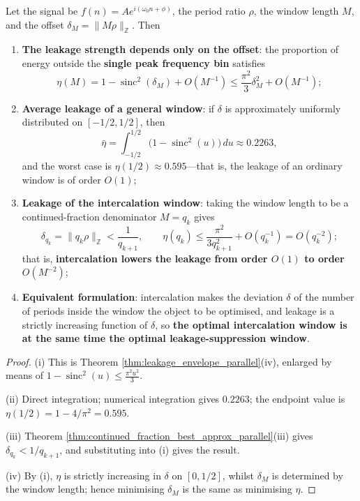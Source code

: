 \begin{theorem}\label{thm:intercalation_leakage_suppression}
Let the signal be $f(n)=Ae^{i(\omega_0n+\phi)}$, the period ratio $\rho$, the window length $M$, and the offset $\delta_M=\|M\rho\|_{\mathbb{Z}}$. Then
\begin{enumerate}[label=(\roman*)]
    \item \textbf{The leakage strength depends only on the offset}: the proportion of energy outside the \textbf{single peak frequency bin} satisfies
    \[
    \eta(M)=1-\operatorname{sinc}^2(\delta_M)+O(M^{-1})\le\frac{\pi^2}{3}\delta_M^{2}+O(M^{-1});
    \]
    \item \textbf{Average leakage of a general window}: if $\delta$ is approximately uniformly distributed on $[-1/2,1/2]$, then
    \[
    \bar\eta=\int_{-1/2}^{1/2}\big(1-\operatorname{sinc}^2(u)\big)\,du\approx0.2263,
    \]
    and the worst case is $\eta(1/2)\approx0.595$---that is, the leakage of an ordinary window is of order $O(1)$;
    \item \textbf{Leakage of the intercalation window}: taking the window length to be a continued-fraction denominator $M=q_k$ gives
    \[
    \delta_{q_k}=\|q_k\rho\|_{\mathbb{Z}}<\frac{1}{q_{k+1}},\qquad
    \eta(q_k)\le\frac{\pi^2}{3q_{k+1}^{2}}+O(q_k^{-1})=O(q_k^{-2});
    \]
    that is, \textbf{intercalation lowers the leakage from order $O(1)$ to order $O(M^{-2})$};
    \item \textbf{Equivalent formulation}: intercalation makes the deviation $\delta$ of the number of periods inside the window the object to be optimised, and leakage is a strictly increasing function of $\delta$, so \textbf{the optimal intercalation window is at the same time the optimal leakage-suppression window}.
\end{enumerate}
\end{theorem}

\begin{proof}
(i) This is Theorem \ref{thm:leakage_envelope_parallel}(iv), enlarged by means of $1-\operatorname{sinc}^2(u)\le\frac{\pi^2u^2}{3}$.

(ii) Direct integration; numerical integration gives $0.2263$; the endpoint value is $\eta(1/2)=1-4/\pi^2=0.595$.

(iii) Theorem \ref{thm:continued_fraction_best_approx_parallel}(iii) gives $\delta_{q_k}<1/q_{k+1}$, and substituting into (i) gives the result.

(iv) By (i), $\eta$ is strictly increasing in $\delta$ on $[0,1/2]$, whilst $\delta_M$ is determined by the window length; hence minimising $\delta_M$ is the same as minimising $\eta$.
\end{proof}

